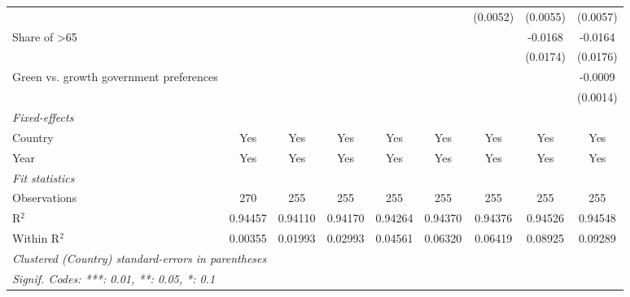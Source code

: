 \begin{table}[htbp]
\begin{tabular}{lcccccccc}
                                                                 &          &          &          &          &          & (0.0052) & (0.0055) & (0.0057)\\   
      Share of >65                                               &          &          &          &          &          &          & -0.0168  & -0.0164\\   
                                                                 &          &          &          &          &          &          & (0.0174) & (0.0176)\\   
      Green vs. growth government preferences                    &          &          &          &          &          &          &          & -0.0009\\   
                                                                 &          &          &          &          &          &          &          & (0.0014)\\   
      \midrule
      \emph{Fixed-effects}\\
      Country                                                    & Yes      & Yes      & Yes      & Yes      & Yes      & Yes      & Yes      & Yes\\  
      Year                                                       & Yes      & Yes      & Yes      & Yes      & Yes      & Yes      & Yes      & Yes\\  
      \midrule
      \emph{Fit statistics}\\
      Observations                                               & 270      & 255      & 255      & 255      & 255      & 255      & 255      & 255\\  
      R$^2$                                                      & 0.94457  & 0.94110  & 0.94170  & 0.94264  & 0.94370  & 0.94376  & 0.94526  & 0.94548\\  
      Within R$^2$                                               & 0.00355  & 0.01993  & 0.02993  & 0.04561  & 0.06320  & 0.06419  & 0.08925  & 0.09289\\  
      \midrule \midrule
      \multicolumn{9}{l}{\emph{Clustered (Country) standard-errors in parentheses}}\\
      \multicolumn{9}{l}{\emph{Signif. Codes: ***: 0.01, **: 0.05, *: 0.1}}\\
   \end{tabular}
\end{table}


